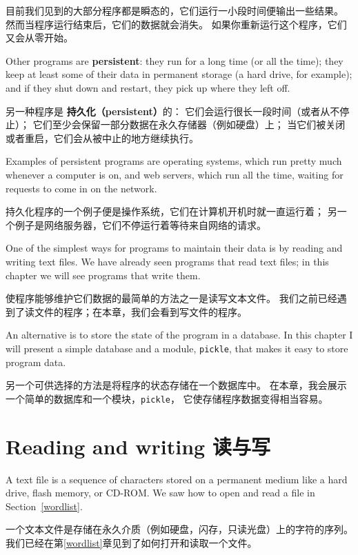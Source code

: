 \documentclass[10pt]{book}
\begin{document}
\begin{CJK}{UTF8}{gbsn}
目前我们见到的大部分程序都是瞬态的，它们运行一小段时间便输出一些结果。
然而当程序运行结束后，它们的数据就会消失。
如果你重新运行这个程序，它们又会从零开始。

Other programs are {\bf persistent}: they run for a long time
(or all the time); they keep at least some of their data
in permanent storage (a hard drive, for example); and
if they shut down and restart, they pick up where they left off.

另一种程序是 {\bf 持久化（persistent）}的：
它们会运行很长一段时间（或者从不停止）；
它们至少会保留一部分数据在永久存储器（例如硬盘）上；
当它们被关闭或者重启，它们会从被中止的地方继续执行。

Examples of persistent programs are operating systems, which
run pretty much whenever a computer is on, and web servers,
which run all the time, waiting for requests to come in on
the network.

持久化程序的一个例子便是操作系统，它们在计算机开机时就一直运行着；
另一个例子是网络服务器，它们不停运行着等待来自网络的请求。

One of the simplest ways for programs to maintain their data
is by reading and writing text files.  We have already seen
programs that read text files; in this chapter we will see programs
that write them.

使程序能够维护它们数据的最简单的方法之一是读写文本文件。
我们之前已经遇到了读文件的程序；在本章，我们会看到写文件的程序。

An alternative is to store the state of the program in a database.
In this chapter I will present a simple database and a module,
{\tt pickle}, that makes it easy to store program data.

另一个可供选择的方法是将程序的状态存储在一个数据库中。
在本章，我会展示一个简单的数据库和一个模块，{\tt pickle}，
它使存储程序数据变得相当容易。

\section{Reading and writing 读与写}

A text file is a sequence of characters stored on a permanent
medium like a hard drive, flash memory, or CD-ROM.  We saw how
to open and read a file in Section~\ref{wordlist}.

一个文本文件是存储在永久介质（例如硬盘，闪存，只读光盘）上的字符的序列。
我们已经在第\ref{wordlist}章见到了如何打开和读取一个文件。


\end{CJK}
\end{document}
